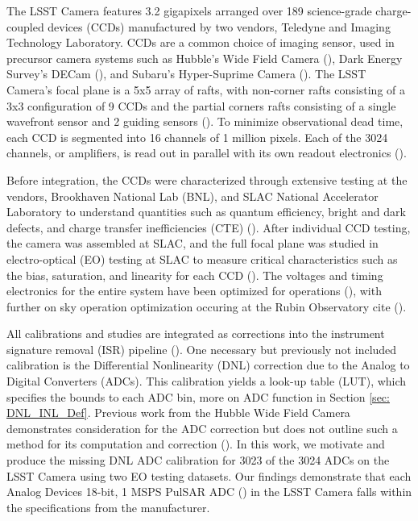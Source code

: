 \documentclass[linenumbers]{aastex7}
\begin{document}
The LSST Camera features 3.2 gigapixels arranged over 189 science-grade charge-coupled devices (CCDs) manufactured by two vendors, Teledyne and Imaging Technology Laboratory. 
CCDs are a common choice of imaging sensor, used in precursor camera systems such as Hubble's Wide Field Camera (\cite{Wyckoff1993}), Dark Energy Survey's DECam (\cite{Flaugher2015}), and Subaru's Hyper-Suprime Camera (\cite{Miyazaki2018}). 
The LSST Camera's focal plane is a 5x5 array of rafts, with non-corner rafts consisting of a 3x3 configuration of 9 CCDs and the partial corners rafts consisting of a single wavefront sensor and 2 guiding sensors (\cite{Arndt2010, Gilmore2008}). 
To minimize observational dead time, each CCD is segmented into 16 channels of 1 million pixels. 
Each of the 3024 channels, or amplifiers, is read out in parallel with its own readout electronics (\cite{Lange2024}). 

Before integration, the CCDs were characterized through extensive testing at the vendors, Brookhaven National Lab (BNL), and SLAC National Accelerator Laboratory to understand quantities such as quantum efficiency, bright and dark defects, and charge transfer inefficiencies (CTE) (\cite{Kotov2016, Doherty2014}).
After individual CCD testing, the camera was assembled at SLAC, and the full focal plane was studied in electro-optical (EO) testing at SLAC to measure critical characteristics such as the bias, saturation, and linearity for each CCD (\cite{Roodman2024}).
The voltages and timing electronics for the entire system have been optimized for operations (\cite{Utsumi2024}), with further on sky operation optimization occuring at the Rubin Observatory cite (\cite{Antilogus2025}). 

All calibrations and studies are integrated as corrections into the instrument signature removal (ISR) pipeline (\cite{PlazasMalagon2025}). 
One necessary but previously not included calibration is the Differential Nonlinearity (DNL) correction due to the Analog to Digital Converters (ADCs).
This calibration yields a look-up table (LUT), which specifies the bounds to each ADC bin, more on ADC function in Section \ref{sec: DNL_INL_Def}. 
Previous work from the Hubble Wide Field Camera demonstrates consideration for the ADC correction but does not outline such a method for its computation and correction (\cite{Wyckoff1993}).
In this work, we motivate and produce the missing DNL ADC calibration for 3023 of the 3024 ADCs on the LSST Camera using two EO testing datasets.
Our findings demonstrate that each Analog Devices 18-bit, 1 MSPS PulSAR ADC (\cite{AnalogDevices}) in the LSST Camera falls within the specifications from the manufacturer. 
\end{document}
